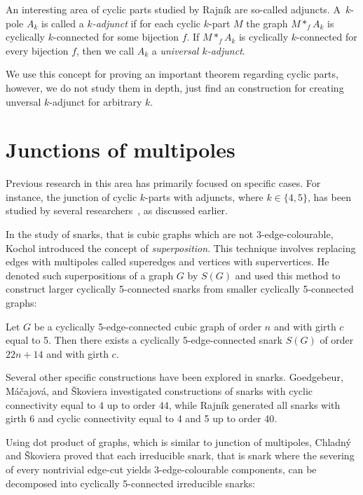 \documentclass[12pt, twoside]{book}
\begin{document}
An interesting area of cyclic parts studied by Rajník \cite{Rajnik_phd} are so-called adjuncts. A~$k$-pole $A_k$ is called a \textit{$k$-adjunct} if for each cyclic $k$-part $M$ the graph $M*_f A_k$ is cyclically $k$-connected for some bijection $f$. If $M*_f A_k$ is cyclically $k$-connected for every bijection $f$, then we call $A_k$ a \emph{universal $k$-adjunct}.

We use this concept for proving an important theorem regarding cyclic parts, however, we do not study them in depth, just find an construction for creating unversal $k$-adjunct for arbitrary $k$.

\section{Junctions of multipoles}

Previous research in this area has primarily focused on specific cases. For instance, the junction of cyclic $k$-parts with adjuncts, where $k\in\{4,5\}$, has been studied by several researchers~\cite{Andersen1988, Rajnik_phd}, as discussed earlier.

In the study of snarks, that is cubic graphs which are not 3-edge-colourable, Kochol introduced the concept of \textit{superposition}. This technique involves replacing edges with multipoles called superedges and vertices with supervertices. He denoted such superpositions of a graph $G$ by $S(G)$ and used this method to construct larger cyclically 5-connected snarks from smaller cyclically 5-connected graphs:

\begin{theorem}
	Let $G$ be a cyclically 5-edge-connected cubic graph of order $n$ and with girth $c$ equal to 5. Then there exists a cyclically \mbox{5-edge-connected} snark $S(G)$ of order $22n+14$ and with girth $c$.
\end{theorem}

Several other specific constructions have been explored in snarks. Goedgebeur, Máčajová, and Škoviera \cite{Goedgebeur2019, Goedgebeur2020} investigated constructions of snarks with cyclic connectivity equal to 4 up to order 44, while Rajník \cite{Rajnik_mgr} generated all snarks with girth 6 and cyclic connectivity equal to 4 and 5 up to order 40.

Using dot product of graphs, which is similar to junction of multipoles, Chladný and Škoviera \cite{Chladny2010} proved that each irreducible snark, that is snark where the severing of every nontrivial edge-cut yields 3-edge-colourable components, can be decomposed into cyclically 5-connected irreducible snarks:
\end{document}
